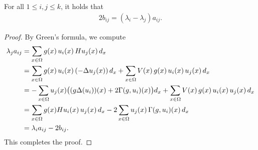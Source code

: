 \documentclass[10pt,a4paper]{amsart}
\begin{document}
\begin{proposition}
For all $1 \le i,j \le k$, it holds that
\begin{align}
2 b_{ij} = (\lambda_i - \lambda_j) a_{ij}.
\end{align}
\end{proposition}

\begin{proof}
By Green's formula, we compute
\begin{align*}
\lambda_j a_{ij}
&= \sum_{x \in \Omega} g(x)\, u_i(x)\, H u_j(x)\, d_x \notag \\
&= \sum_{x \in \Omega} g(x)\, u_i(x)\, (-\Delta u_j(x))\, d_x
   + \sum_{x \in \Omega} V(x)\, g(x)\, u_i(x)\, u_j(x)\, d_x \notag \\
&= - \sum_{x \in \Omega} u_j(x)
   \bigl( (g\Delta ( u_i))(x) + 2 \Gamma(g,u_i)(x) \bigr) d_x
   + \sum_{x \in \Omega} V(x)\, g(x)\, u_i(x)\, u_j(x)\, d_x \notag \\
&= \sum_{x \in \Omega}g(x) H u_i(x)\, u_j(x)\, d_x
   - 2 \sum_{x \in \Omega} u_j(x)\, \Gamma(g,u_i)(x)\, d_x \notag \\
&= \lambda_i a_{ij} - 2 b_{ij}.
\end{align*}
This completes the proof.
\end{proof}
\end{document}
